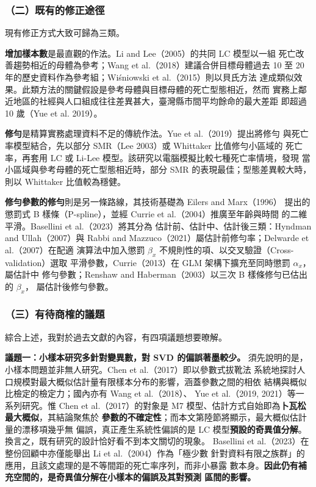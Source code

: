 \documentclass[UTF8, fontset=macnew, a4paper, 12pt]{ctexart}
\begin{document}
\subsubsection{（二）既有的修正途徑}

現有修正方式大致可歸為三類。

\textbf{增加樣本數}是最直觀的作法。Li and Lee（2005）的共同 LC 模型以一組
死亡改善趨勢相近的母體為參考；Wang et al.（2018）建議合併目標母體過去
10 至 20 年的歷史資料作為參考組；Wiśniowski et al.（2015）則以貝氏方法
達成類似效果。此類方法的關鍵假設是參考母體與目標母體的死亡型態相近，然而
實務上鄰近地區的社經與人口組成往往差異甚大，臺灣縣市間平均餘命的最大差距
即超過 10 歲（Yue et al. 2019）。

\textbf{修勻}是精算實務處理資料不足的傳統作法。Yue et al.（2019）提出將修勻
與死亡率模型結合，先以部分 SMR（Lee 2003）或 Whittaker 比值修勻小區域的
死亡率，再套用 LC 或 Li-Lee 模型。該研究以電腦模擬比較七種死亡率情境，發現
當小區域與參考母體的死亡型態相近時，部分 SMR 的表現最佳；型態差異較大時，
則以 Whittaker 比值較為穩健。

\textbf{修勻參數的修勻}則是另一條路線，其技術基礎為 Eilers and Marx（1996）
提出的懲罰式 B 樣條（P-spline），並經 Currie et al.（2004）推廣至年齡與時間
的二維平滑。Basellini et al.（2023）將其分為
估計前、估計中、估計後三類：Hyndman and Ullah（2007）與
Rabbi and Mazzuco（2021）屬估計前修勻率；Delwarde et al.（2007）在配適
演算法中加入懲罰 $\beta_x$ 不規則性的項、以交叉驗證（Cross-validation）選取
平滑參數，Currie（2013）在 GLM 架構下擴充至同時懲罰 $\alpha_x$，屬估計中
修勻參數；Renshaw and Haberman（2003）以三次 B 樣條修勻已估出的 $\beta_x$，
屬估計後修勻參數。

\subsubsection{（三）有待商榷的議題}

綜合上述，我對於過去文獻的內容，有四項議題想要暸解。

\textbf{議題一：小樣本研究多針對變異數，對 SVD 的偏誤著墨較少。}
須先說明的是，小樣本問題並非無人研究。Chen et al.（2017）即以參數式拔靴法
系統地探討人口規模對最大概似估計量有限樣本分布的影響，涵蓋參數之間的相依
結構與概似比檢定的檢定力；國內亦有 Wang et al.（2018）、
Yue et al.（2019, 2021）等一系列研究。惟 Chen et al.（2017）的對象是
M7 模型、估計方式自始即為\textbf{卜瓦松最大概似}，其結論聚焦於
\textbf{參數的不確定性}；而本文第陸節將顯示，最大概似估計量的漂移項幾乎無
偏誤，真正產生系統性偏誤的是 LC 模型\textbf{預設的奇異值分解}。
換言之，既有研究的設計恰好看不到本文關切的現象。
Basellini et al.（2023）在整份回顧中亦僅能舉出 Li et al.（2004）作為「極少數
針對資料有限之族群」的應用，且該文處理的是不等間距的死亡率序列，而非小暴露
數本身。\textbf{因此仍有補充空間的，是奇異值分解在小樣本的偏誤及其對預測
區間的影響。}
\end{document}
